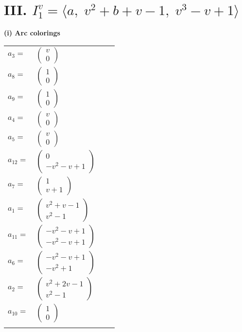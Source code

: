 \documentclass[1p]{elsarticle_modified}
\theoremstyle{definition}
\begin{document}
\centering \section*{III. $I^v_{1}= \langle a,\;v^2+b+v-1,\;v^3- v+1 \rangle$}
\flushleft \textbf{(i) Arc colorings}\\
\begin{tabular}{m{7pt} m{180pt} m{7pt} m{180pt} }
\flushright $a_{3}=$&$\begin{pmatrix}v\\0\end{pmatrix}$ \\
\flushright $a_{8}=$&$\begin{pmatrix}1\\0\end{pmatrix}$ \\
\flushright $a_{9}=$&$\begin{pmatrix}1\\0\end{pmatrix}$ \\
\flushright $a_{4}=$&$\begin{pmatrix}v\\0\end{pmatrix}$ \\
\flushright $a_{5}=$&$\begin{pmatrix}v\\0\end{pmatrix}$ \\
\flushright $a_{12}=$&$\begin{pmatrix}0\\- v^2- v+1\end{pmatrix}$ \\
\flushright $a_{7}=$&$\begin{pmatrix}1\\v+1\end{pmatrix}$ \\
\flushright $a_{1}=$&$\begin{pmatrix}v^2+v-1\\v^2-1\end{pmatrix}$ \\
\flushright $a_{11}=$&$\begin{pmatrix}- v^2- v+1\\- v^2- v+1\end{pmatrix}$ \\
\flushright $a_{6}=$&$\begin{pmatrix}- v^2- v+1\\- v^2+1\end{pmatrix}$ \\
\flushright $a_{2}=$&$\begin{pmatrix}v^2+2 v-1\\v^2-1\end{pmatrix}$ \\
\flushright $a_{10}=$&$\begin{pmatrix}1\\0\end{pmatrix}$\\&\end{tabular}
\end{document}
